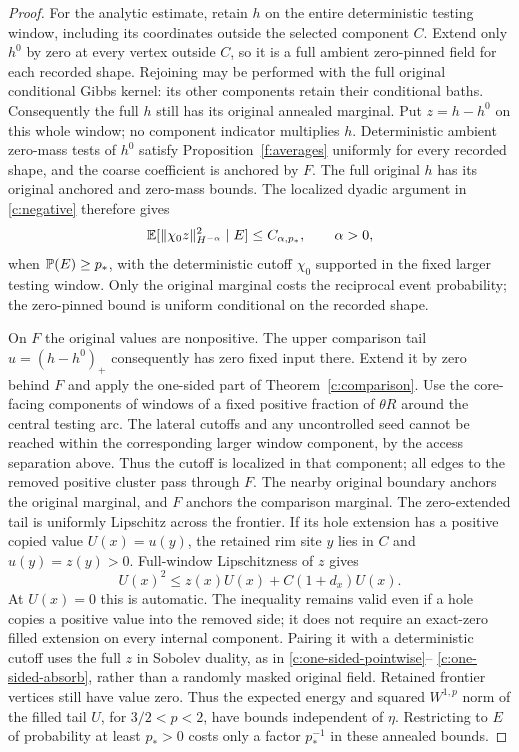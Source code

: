 \begin{proof}
For the analytic estimate, retain $h$ on the entire deterministic
testing window, including its coordinates outside the selected
component $C$. Extend only $h^0$ by zero at every vertex outside $C$,
so it is a full ambient zero-pinned field for each recorded shape.
Rejoining may be performed with the full original conditional Gibbs
kernel: its other components retain their conditional baths.
Consequently the full $h$ still has its original annealed marginal.
Put $z=h-h^0$ on this whole window; no component indicator multiplies
$h$. Deterministic ambient zero-mass tests of $h^0$ satisfy
Proposition~\ref{f:averages} uniformly for every recorded shape,
and the coarse coefficient is anchored by $F$. The full original
$h$ has its original anchored and zero-mass bounds. The localized
dyadic argument in \eqref{c:negative} therefore gives
\[
 \mathbb E[\|\chi_0 z\|_{H^{-\alpha}}^2\mid E]
 \le C_{\alpha,p_*},\qquad \alpha>0,
\]
when $\mathbb P(E)\ge p_*$, with the deterministic cutoff $\chi_0$
supported in the fixed larger testing window. Only the original
marginal costs the reciprocal event probability; the zero-pinned
bound is uniform conditional on the recorded shape.

On $F$ the original values are nonpositive. The upper comparison tail
$u=(h-h^0)_+$ consequently has zero fixed input there. Extend it by
zero behind $F$ and apply the one-sided part of
Theorem~\ref{c:comparison}. Use the core-facing components of windows
of a fixed positive fraction of $\theta R$ around the central testing
arc. The lateral cutoffs and any uncontrolled seed cannot be reached
within the corresponding larger window component, by the access
separation above. Thus the cutoff is localized in that component;
all edges to the removed positive cluster pass through $F$.
The nearby original boundary anchors the original marginal, and
$F$ anchors the comparison marginal. The zero-extended tail is
uniformly Lipschitz across the frontier. If its hole extension has
a positive copied value $U(x)=u(y)$, the retained rim site $y$ lies
in $C$ and $u(y)=z(y)>0$. Full-window Lipschitzness of $z$ gives
\[
 U(x)^2\le z(x)U(x)+C(1+d_x)U(x).
\]
At $U(x)=0$ this is automatic. The inequality remains valid even
if a hole copies a positive value into the removed side; it does
not require an exact-zero filled extension on every internal
component. Pairing it with a deterministic cutoff uses the full
$z$ in Sobolev duality, as in \eqref{c:one-sided-pointwise}--
\eqref{c:one-sided-absorb}, rather than a randomly masked original
field. Retained frontier vertices still have value zero.
Thus the expected energy and
squared $W^{1,p}$ norm of the filled tail $U$, for $3/2<p<2$, have
bounds independent of $\eta$. Restricting to $E$ of probability at
least $p_*>0$ costs only a factor $p_*^{-1}$ in these annealed bounds.


\end{proof}
